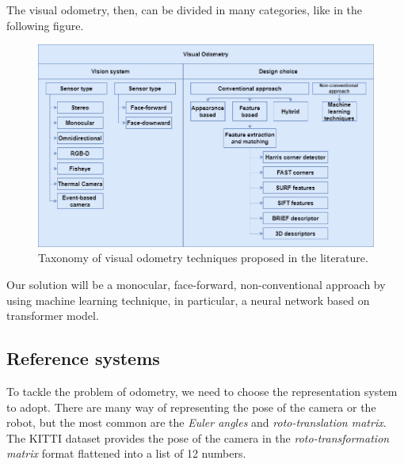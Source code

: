 The visual odometry, then, can be divided in many categories, like in the following figure.

\begin{figure}[H]
    \centering
    \includegraphics[width=\textwidth]{images/2_2_visual_odometry_taxonomy}
    \caption{Taxonomy of visual odometry techniques proposed in the literature.}\label{fig:visual-odometry-taxonomy}
\end{figure}
Our solution will be a monocular, face-forward, non-conventional approach by using machine learning technique, in particular, a neural network based on transformer model.

\subsection{Reference systems}\label{subsec:reference-systems}
To tackle the problem of odometry, we need to choose the representation system to adopt.
There are many way of representing the pose of the camera or the robot, but the most common are the \textit{Euler angles} and \textit{roto-translation matrix}.
The KITTI dataset provides the pose of the camera in the \textit{roto-transformation matrix} format flattened into a list of 12 numbers.

